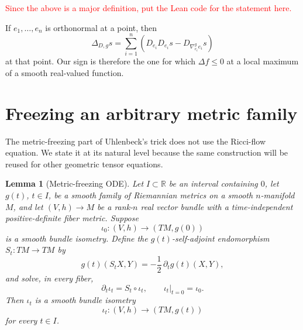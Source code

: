 \documentclass[10pt]{coll-l}
\newtheorem{lemma}[theorem]{Lemma}
\theoremstyle{definition}
\theoremstyle{remark}
\numberwithin{section}{chapter}
\numberwithin{equation}{chapter}
\begin{document}
\textcolor{red}{Since the above is a major definition, put the Lean code for the statement here.}

If $e_1,\ldots,e_n$ is orthonormal at a point, then
\begin{equation}
 \Delta_{D,g}s
   =\sum_{i=1}^n
       \left(D_{e_i}D_{e_i}s-D_{\nabla^g_{e_i}e_i}s\right)              \label{eq:ue-laplacian-frame}
\end{equation}
at that point.  Our sign is therefore the one for which $\Delta f\leq0$ at
a local maximum of a smooth real-valued function.

\section{Freezing an arbitrary metric family}
\label{sec:ue-freezing}

The metric-freezing part of Uhlenbeck's trick does not use the Ricci-flow
equation.  We state it at its natural level because the same construction
will be reused for other geometric tensor equations.

\begin{lemma}[Metric-freezing ODE]
\label{lem:ue-metric-freezing}
Let $I\subset\mathbb R$ be an interval containing $0$, let $g(t)$,
$t\in I$, be a smooth family of Riemannian metrics on a smooth
$n$-manifold $M$, and let $(V,h)\to M$ be a rank-$n$ real vector bundle
with a time-independent positive-definite fiber metric.  Suppose
\[
             \iota_0:(V,h)\longrightarrow(TM,g(0))
\]
is a smooth bundle isometry.  Define the $g(t)$-self-adjoint endomorphism
$S_t:TM\to TM$ by
\begin{equation}
       g(t)(S_tX,Y)=-\frac12\,\partial_tg(t)(X,Y),        \label{eq:ue-general-gauge-velocity}
\end{equation}
and solve, in every fiber,
\begin{equation}
       \partial_t\iota_t=S_t\circ\iota_t,
       \qquad \iota_t|_{t=0}=\iota_0.                   \label{eq:ue-general-iota-ode}
\end{equation}
Then $\iota_t$ is a smooth bundle isometry
\[
             \iota_t:(V,h)\longrightarrow(TM,g(t))
\]
for every $t\in I$.
\end{lemma}
\end{document}
